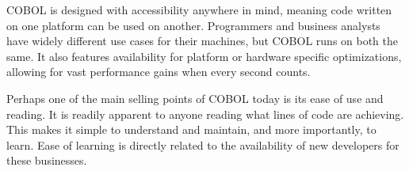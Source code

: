 \documentclass[12pt]{article}
\begin{document}
COBOL is designed with accessibility anywhere in mind, meaning code written on one platform can be used on another.
Programmers and business analysts have widely different use cases for their machines, but COBOL runs on both the same.
It also features availability for platform or hardware specific optimizations, allowing for vast performance gains when every second counts.

Perhaps one of the main selling points of COBOL today is its ease of use and reading.
It is readily apparent to anyone reading what lines of code are achieving.
This makes it simple to understand and maintain, and more importantly, to learn.
Ease of learning is directly related to the availability of new developers for these businesses.
\end{document}
